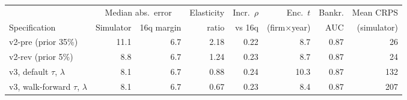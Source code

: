 \begin{tabular}{lrrrrrrr}
\toprule
 & \multicolumn{2}{c}{Median abs.\ error} & Elasticity & Incr.\ $\rho$ & Enc.\ $t$ & Bankr. & Mean CRPS \\
\cmidrule(lr){2-3}
Specification & Simulator & 16q margin & ratio & vs 16q & (firm$\times$year) & AUC & (simulator) \\
\midrule
v2-pre (prior 35\%) & 11.1 & 6.7 & 2.18 & 0.22 & 8.7 & 0.87 & 26 \\
v2-rev (prior 5\%) & 8.8 & 6.7 & 1.24 & 0.23 & 8.7 & 0.87 & 24 \\
v3, default $\tau$, $\lambda$ & 8.1 & 6.7 & 0.88 & 0.24 & 10.3 & 0.87 & 132 \\
v3, walk-forward $\tau$, $\lambda$ & 8.1 & 6.7 & 0.67 & 0.23 & 8.4 & 0.87 & 207 \\
\bottomrule
\end{tabular}
